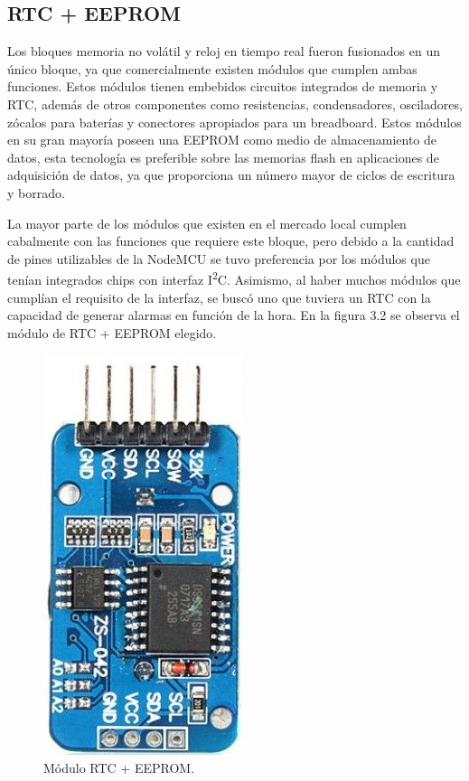 \subsection{RTC + EEPROM}

Los bloques memoria no volátil y reloj en tiempo real fueron fusionados en un único bloque, ya que comercialmente existen módulos que cumplen ambas funciones. Estos módulos tienen embebidos circuitos integrados de memoria y RTC, además de otros componentes como resistencias, condensadores, osciladores, zócalos para baterías y conectores apropiados para un breadboard. Estos módulos en su gran mayoría poseen una EEPROM como medio de almacenamiento de datos, esta tecnología es preferible sobre las memorias flash en aplicaciones de adquisición de datos, ya que proporciona un número mayor de ciclos de escritura y borrado.

La mayor parte de los módulos que existen en el mercado local cumplen cabalmente con las funciones que requiere este bloque, pero debido a la cantidad de pines utilizables de la NodeMCU se tuvo preferencia por los módulos que tenían integrados chips con interfaz I\textsuperscript{2}C. Asimismo, al haber muchos módulos que cumplían el requisito de la interfaz, se buscó uno que tuviera un RTC con la capacidad de generar alarmas en función de la hora. En la figura 3.2 se observa el módulo de RTC + EEPROM elegido.

\begin{figure}[h]
	\centering
	\includegraphics[scale=0.4]{./Figures/rtc_eeprom.jpg}
	\caption{Módulo RTC + EEPROM\protect\footnotemark.}
		\label{fig:cuadradoAzul}
	\end{figure}

